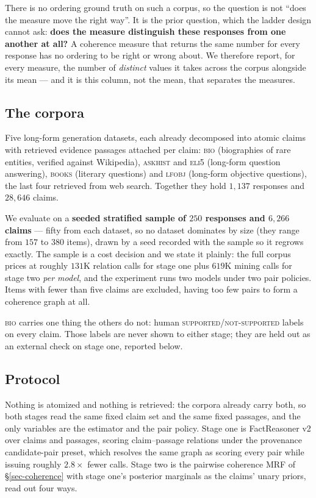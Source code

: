 There is no ordering ground truth on such a corpus, so the question is not ``does the measure move the
right way''. It is the prior question, which the ladder design cannot ask: \textbf{does the measure
distinguish these responses from one another at all?} A coherence measure that returns the same number
for every response has no ordering to be right or wrong about. We therefore report, for every measure,
the number of \emph{distinct} values it takes across the corpus alongside its mean --- and it is this
column, not the mean, that separates the measures.

\subsection{The corpora}
\label{sec-fc-corpus}

Five long-form generation datasets, each already decomposed into atomic claims with retrieved
evidence passages attached per claim: \textsc{bio} (biographies of rare entities, verified against
Wikipedia), \textsc{askhist} and \textsc{eli5} (long-form question answering), \textsc{books}
(literary questions) and \textsc{lfobj} (long-form objective questions), the last four retrieved from
web search. Together they hold $1{,}137$ responses and $28{,}646$ claims.

We evaluate on a \textbf{seeded stratified sample of $250$ responses and $6{,}266$ claims} --- fifty
from each dataset, so no dataset dominates by size (they range from $157$ to $380$ items), drawn by a
seed recorded with the sample so it regrows exactly. The sample is a cost decision and we state it
plainly: the full corpus prices at roughly $131$K relation calls for stage one plus $619$K mining
calls for stage two \emph{per model}, and the experiment runs two models under two pair policies. Items
with fewer than five claims are excluded, having too few pairs to form a coherence graph at all.

\textsc{bio} carries one thing the others do not: human \textsc{supported}/\textsc{not-supported}
labels on every claim. Those labels are never shown to either stage; they are held out as an external
check on stage one, reported below.

\subsection{Protocol}
\label{sec-fc-protocol}

Nothing is atomized and nothing is retrieved: the corpora already carry both, so both stages read the
same fixed claim set and the same fixed passages, and the only variables are the estimator and the
pair policy. Stage one is FactReasoner v2 over claims and passages, scoring claim--passage relations
under the provenance candidate-pair preset, which resolves the same graph as scoring every pair while
issuing roughly $2.8\times$ fewer calls. Stage two is the pairwise coherence MRF of
\S\ref{sec-coherence} with stage one's posterior marginals as the claims' unary priors, read out four
ways.

